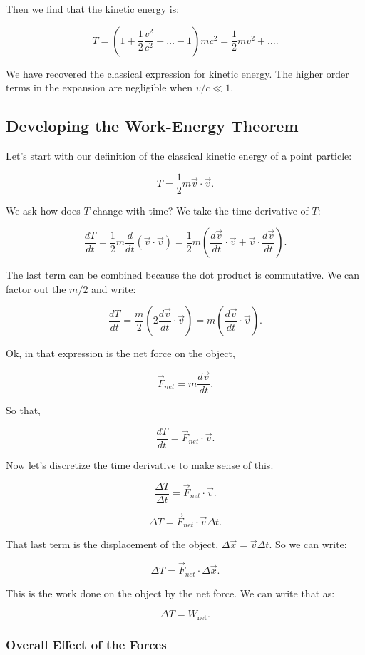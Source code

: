 \documentclass[11pt]{article}
\begin{document}
Then we find that the kinetic energy is:

\[T = \left(1 + \frac{1}{2}\frac{v^2}{c^2} + \ldots - 1\right)mc^2 = \frac{1}{2}mv^2 + \ldots.\]

We have recovered the classical expression for kinetic energy. The
higher order terms in the expansion are negligible when \(v/c \ll 1\).

    \subsection{Developing the Work-Energy
Theorem}\label{developing-the-work-energy-theorem}

Let's start with our definition of the classical kinetic energy of a
point particle:

\[T = \frac{1}{2}m\vec{v}\cdot\vec{v}.\]

We ask how does \(T\) change with time? We take the time derivative of
\(T\):

\[\dfrac{dT}{dt} = \frac{1}{2}m\frac{d}{dt}\left(\vec{v}\cdot\vec{v}\right) = \frac{1}{2}m\left(\frac{d\vec{v}}{dt}\cdot\vec{v} + \vec{v}\cdot\frac{d\vec{v}}{dt}\right).\]

The last term can be combined because the dot product is commutative. We
can factor out the \(m/2\) and write:

\[\dfrac{dT}{dt} = \dfrac{m}{2}\left(2 \dfrac{d\vec{v}}{dt}\cdot\vec{v}\right) = m\left(\dfrac{d\vec{v}}{dt}\cdot\vec{v}\right).\]

Ok, in that expression is the net force on the object,

\[\vec{F}_{net} = m\dfrac{d\vec{v}}{dt}.\]

So that,

\[\dfrac{dT}{dt} = \vec{F}_{net}\cdot\vec{v}.\]

Now let's discretize the time derivative to make sense of this.

\[\dfrac{\Delta T}{\Delta t} = \vec{F}_{net}\cdot\vec{v}.\]

\[\Delta T = \vec{F}_{net}\cdot\vec{v}\Delta t.\]

That last term is the displacement of the object,
\(\Delta \vec{x} = \vec{v}\Delta t\). So we can write:

\[\Delta T = \vec{F}_{net}\cdot\Delta \vec{x}.\]

This is the work done on the object by the net force. We can write that
as:

\[\Delta T = W_{\text{net}}.\]

    \subsubsection{Overall Effect of the
Forces}\label{overall-effect-of-the-forces}
\end{document}
